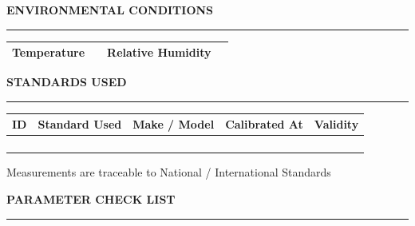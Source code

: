 \documentclass[a4paper,10pt]{article}
\newcommand{\sectiontitle}[1]
{
\vspace{2mm}

{\large\bfseries #1}

\vspace{0.5mm}

\hrule

\vspace{1.5mm}
}
\begin{document}

\sectiontitle{ENVIRONMENTAL CONDITIONS}

\begin{tabularx}{\textwidth}{|>{\bfseries}l|X|>{\bfseries}l|X|}
\hline
Temperature &
&
Relative Humidity &
\\
\hline
\end{tabularx}

\vspace{2mm}


\sectiontitle{STANDARDS USED}

\begin{tabularx}{\textwidth}
{|c|X|X|X|c|}
\hline

\textbf{ID} &
\textbf{Standard Used} &
\textbf{Make / Model} &
\textbf{Calibrated At} &
\textbf{Validity}
\\
\hline

& & & & \\
\hline

& & & & \\
\hline

& & & & \\
\hline

& & & & \\
\hline

\end{tabularx}

\vspace{2mm}

\begin{center}
\small
Measurements are traceable to National / International Standards
\end{center}


\newpage


\sectiontitle{ PARAMETER CHECK LIST}
\end{document}
